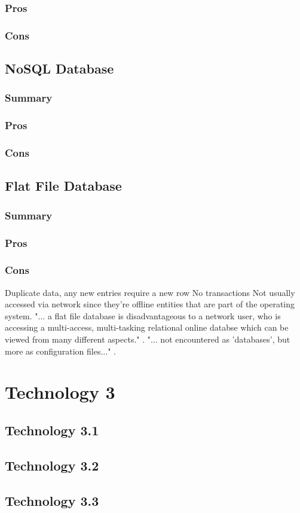 \documentclass[draftclsnofoot,onecolumn,letterpaper,10pt,compsoc]{IEEEtran}
\begin{document}
        \subsubsection{Pros}
    
        \subsubsection{Cons}
        
        
	\subsection{NoSQL Database}
        \subsubsection{Summary}
    
        \subsubsection{Pros}
    
        \subsubsection{Cons}
        
        
	\subsection{Flat File Database}
        \subsubsection{Summary}
    
        \subsubsection{Pros}
    
        \subsubsection{Cons}
            Duplicate data, any new entries require a new row
            No transactions
            Not usually accessed via network since they're offline entities that are part of the operating system\cite{Techwalla}.
            "... a flat file database is disadvantageous to a network user, who is accessing a multi-access, multi-tasking relational online databse which can be viewed from many different aspects." \cite{Techwalla}.
            "... not encountered as 'databases', but more as configuration files..." \cite{Techwalla}.


\section{Technology 3}
	\subsection{Technology 3.1}
	\subsection{Technology 3.2}
	\subsection{Technology 3.3}

{}

\end{document}
